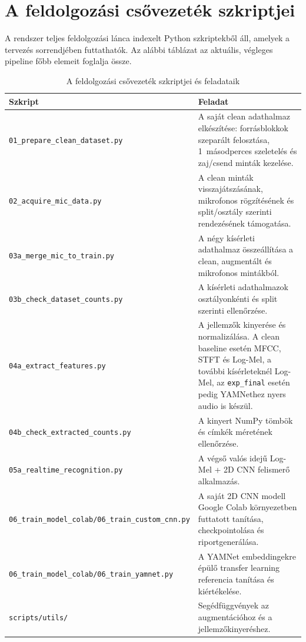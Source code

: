 \section{A feldolgozási csővezeték szkriptjei}
\label{sec:pipeline_scripts}

A rendszer teljes feldolgozási lánca indexelt Python szkriptekből áll, amelyek
a tervezés sorrendjében futtathatók. Az alábbi táblázat az aktuális, végleges
pipeline főbb elemeit foglalja össze.

\begin{table}[ht!]
\centering
\small
\caption{A feldolgozási csővezeték szkriptjei és feladataik}
\label{tab:pipeline_scripts}
\begin{tabular}{p{5.8cm}p{8.7cm}}
\toprule
\textbf{Szkript} & \textbf{Feladat} \\
\midrule
\texttt{01\_prepare\_\allowbreak clean\_\allowbreak dataset.py} & A saját clean adathalmaz elkészítése: forrásblokkok szeparált felosztása, 1~másodperces szeletelés és zaj/csend minták kezelése. \\
\texttt{02\_acquire\_\allowbreak mic\_\allowbreak data.py} & A clean minták visszajátszásának, mikrofonos rögzítésének és split/osztály szerinti rendezésének támogatása. \\
\texttt{03a\_merge\_\allowbreak mic\_\allowbreak to\_\allowbreak train.py} & A négy kísérleti adathalmaz összeállítása a clean, augmentált és mikrofonos mintákból. \\
\texttt{03b\_check\_\allowbreak dataset\_\allowbreak counts.py} & A kísérleti adathalmazok osztályonkénti és split szerinti ellenőrzése. \\
\texttt{04a\_extract\_\allowbreak features.py} & A jellemzők kinyerése és normalizálása. A clean baseline esetén MFCC, STFT és Log-Mel, a további kísérleteknél Log-Mel, az \texttt{exp\_final} esetén pedig YAMNethez nyers audio is készül. \\
\texttt{04b\_check\_\allowbreak extracted\_\allowbreak counts.py} & A kinyert NumPy tömbök és címkék méretének ellenőrzése. \\
\texttt{05a\_realtime\_\allowbreak recognition.py} & A végső valós idejű Log-Mel + 2D CNN felismerő alkalmazás. \\
\texttt{06\_train\_\allowbreak model\_\allowbreak colab/06\_train\_\allowbreak custom\_\allowbreak cnn.py} & A saját 2D CNN modell Google Colab környezetben futtatott tanítása, checkpointolása és riportgenerálása. \\
\texttt{06\_train\_\allowbreak model\_\allowbreak colab/06\_train\_\allowbreak yamnet.py} & A YAMNet embeddingekre épülő transfer learning referencia tanítása és kiértékelése. \\
\texttt{scripts/utils/} & Segédfüggvények az augmentációhoz és a jellemzőkinyeréshez. \\
\bottomrule
\end{tabular}
\end{table}

